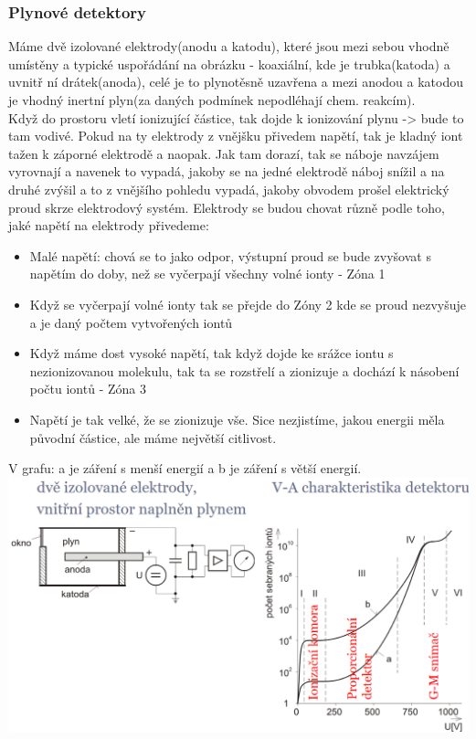 \subsubsection*{Plynové detektory}
Máme dvě izolované elektrody(anodu a katodu), které jsou mezi sebou vhodně umístěny a typické uspořádání na obrázku - koaxiální, kde je trubka(katoda) a uvnitř ní drátek(anoda), celé je to plynotěsně uzavřena a mezi anodou a katodou je vhodný inertní plyn(za daných podmínek nepodléhají chem. reakcím).\\
Když do prostoru vletí ionizující částice, tak dojde k ionizování plynu -> bude to tam vodivé. Pokud na ty elektrody z vnějšku přivedem napětí, tak je kladný iont tažen k záporné elektrodě a naopak. Jak tam dorazí, tak se náboje navzájem vyrovnají a navenek to vypadá, jakoby se na jedné elektrodě náboj snížil a na druhé zvýšil a to z vnějšího pohledu vypadá, jakoby obvodem prošel elektrický proud skrze elektrodový systém.
Elektrody se budou chovat různě podle toho, jaké napětí na elektrody přivedeme:
\begin{itemize}
    \item Malé napětí: chová se to jako odpor, výstupní proud se bude zvyšovat s napětím do doby, než se vyčerpají všechny volné ionty - Zóna 1
    \item Když se vyčerpají volné ionty tak se přejde do Zóny 2 kde se proud nezvyšuje a je daný počtem vytvořených iontů
    \item Když máme dost vysoké napětí, tak když dojde ke srážce iontu s nezionizovanou molekulu, tak ta se rozstřelí a zionizuje a dochází k násobení počtu iontů - Zóna 3
    \item Napětí je tak velké, že se zionizuje vše. Sice nezjistíme, jakou energii měla původní částice, ale máme největší citlivost.
\end{itemize}
V grafu: a je záření s menší energií a b je záření s větší energií.\\
\includegraphics*[scale=0.3]{img/ionizační-plyn.png}

